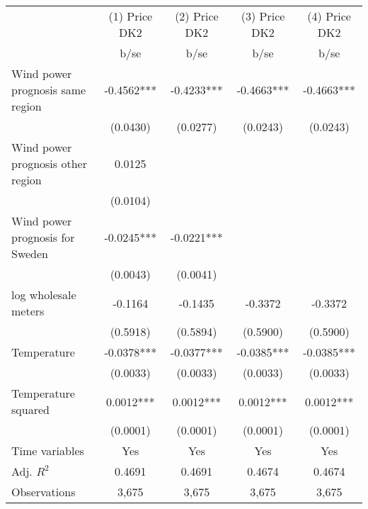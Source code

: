 \begin{tabular}{lcccc}\toprule
                    &(1) Price DK2   &(2) Price DK2   &(3) Price DK2   &(4) Price DK2   \\
                    &        b/se   &        b/se   &        b/se   &        b/se   \\
\midrule
Wind power prognosis same region&     -0.4562***&     -0.4233***&     -0.4663***&     -0.4663***\\
                    &    (0.0430)   &    (0.0277)   &    (0.0243)   &    (0.0243)   \\
Wind power prognosis other region&      0.0125   &               &               &               \\
                    &    (0.0104)   &               &               &               \\
Wind power prognosis for Sweden&     -0.0245***&     -0.0221***&               &               \\
                    &    (0.0043)   &    (0.0041)   &               &               \\
log wholesale meters&     -0.1164   &     -0.1435   &     -0.3372   &     -0.3372   \\
                    &    (0.5918)   &    (0.5894)   &    (0.5900)   &    (0.5900)   \\
Temperature         &     -0.0378***&     -0.0377***&     -0.0385***&     -0.0385***\\
                    &    (0.0033)   &    (0.0033)   &    (0.0033)   &    (0.0033)   \\
Temperature squared &      0.0012***&      0.0012***&      0.0012***&      0.0012***\\
                    &    (0.0001)   &    (0.0001)   &    (0.0001)   &    (0.0001)   \\
Time variables      &         Yes   &         Yes   &         Yes   &         Yes   \\
\midrule
Adj. \(R^2\)        &      0.4691   &      0.4691   &      0.4674   &      0.4674   \\
Observations        &       3,675   &       3,675   &       3,675   &       3,675   \\
\bottomrule\end{tabular}
